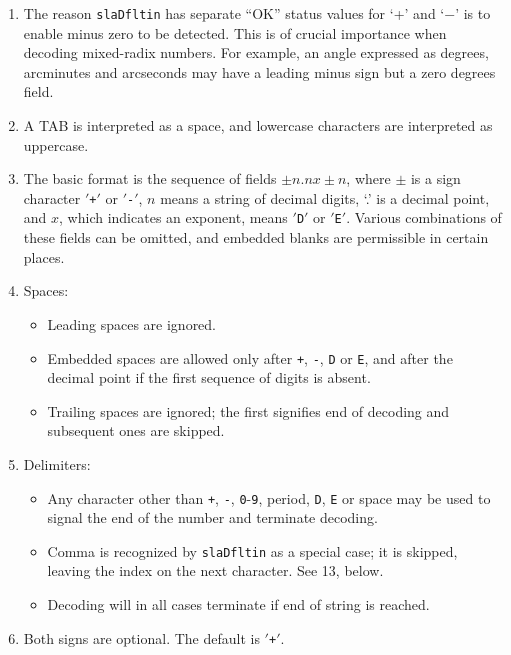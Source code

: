 \documentclass[11pt,fleqn,twoside]{article}
\renewcommand{\_}{{\tt\char'137}}     %
\newcommand{\fstring}[1]{\hspace{0.05em}\mbox{$'${\tt#1}\hspace{0.09em}$'$}}
\begin{document}
{
 \begin{enumerate}
 \item The reason {\tt slaDfltin} has separate ``OK'' status values
       for `+' and `$-$'
       is to enable minus zero to be detected.
       This is of crucial importance
       when decoding mixed-radix numbers.  For example, an angle
       expressed as degrees, arcminutes and arcseconds may have a
       leading minus sign but a zero degrees field.
 \item A TAB is interpreted as a space, and lowercase characters are
       interpreted as uppercase.
 \item The basic format is the sequence of fields $\pm n.n x \pm n$,
       where $\pm$ is a sign
       character \fstring{+} or \fstring{-},
       $n$ means a string of decimal digits,
       `.' is a decimal point, and $x$, which indicates an exponent,
       means \fstring{D} or \fstring{E}.
       Various combinations of these fields can be
       omitted, and embedded blanks are permissible in certain places.
 \item Spaces:
       \begin{itemize}
       \item Leading spaces are ignored.
       \item Embedded spaces are allowed only after
             {\tt +},
             {\tt -},
             {\tt D} or
             {\tt E},
             and after the decimal point if the first sequence of
             digits is absent.
       \item Trailing spaces are ignored;  the first signifies
             end of decoding and subsequent ones are skipped.
       \end{itemize}
 \item Delimiters:
       \begin{itemize}
       \item Any character other than
             {\tt +},
             {\tt -},
             {\tt 0}-{\tt 9},
             period,
             {\tt D},
             {\tt E} or space may be
             used to signal the end of the number and terminate decoding.
       \item Comma is recognized by {\tt slaDfltin} as a special case; it
             is skipped, leaving the index on the next character.  See
             13, below.
       \item Decoding will in all cases terminate if end of string
             is reached.
       \end{itemize}
 \item Both signs are optional.  The default is \fstring{+}.

\end{enumerate}}
\end{document}
